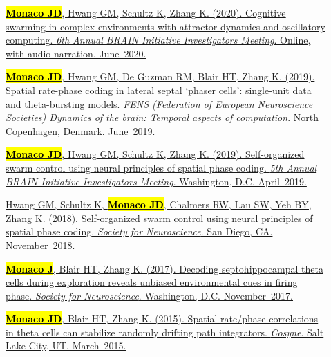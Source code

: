 \documentclass[10pt]{article}
\newcommand{\itemtitle}[1]{{\color{hopkinsblue}\ul{#1}}}
\newcommand{\joehl}[1]{\hl{\textbf{#1}}}
\begin{document}
\begin{description}
  \item[\quad]
    \href{https://www.cvent.com/events/6th-annual-brain-initiative-investigators-meeting/custom-116-4e2aadaa6cd549a3a4b53113cd172ad2.aspx}
    {\joehl{Monaco JD}, Hwang GM, Schultz K, Zhang K. (2020).
    \itemtitle{Cognitive swarming in complex environments with attractor
        dynamics and oscillatory computing}. \emph{6th Annual BRAIN Initiative
    Investigators Meeting}. Online, with audio narration. June~2020.}
  \item[\quad]
    \href{https://www.fens.org/Meetings/The-Brain-Conferences/Dynamics-of-the-brain/}
    {\joehl{Monaco JD}, Hwang GM, De Guzman RM, Blair HT, Zhang K. (2019).
    \itemtitle{Spatial rate-phase coding in lateral septal ‘phaser cells’:
        single-unit data and theta-bursting models}. \emph{FENS (Federation of
        European Neuroscience Societies) Dynamics of the brain: Temporal aspects of
    computation}. North Copenhagen, Denmark. June~2019.}
  \item[\quad]
    \href{https://www.cvent.com/events/5th-annual-brain-initiative-investigators-meeting/event-summary-de9c0d8f934b46eb8d80b55bcfbfe96a.aspx}
    {\joehl{Monaco JD}, Hwang GM, Schultz K, Zhang K. (2019).
    \itemtitle{Self-organized swarm control using neural principles of spatial
      phase coding}. \emph{5th Annual BRAIN Initiative Investigators Meeting}.
    Washington, D.C. April~2019.} 
  \item[\quad]
    \href{https://abstractsonline.com/pp8/#!/4649/presentation/10884}
    {Hwang GM, Schultz K, \joehl{Monaco JD}, Chalmers RW, Lau SW, Yeh BY,
      Zhang K. (2018). \itemtitle{Self-organized swarm control using neural
      principles of spatial phase coding}. \emph{Society for Neuroscience}.
    San Diego, CA. November~2018.}
  \item[\quad]
    \href{https://www.abstractsonline.com/pp8/#!/4376/presentation/6085}
    {\joehl{Monaco J}, Blair HT, Zhang K. (2017). \itemtitle{Decoding
        septohippocampal theta cells during exploration reveals unbiased
      environmental cues in firing phase}. \emph{Society for Neuroscience}.
    Washington, D.C. November~2017.}
  \item[\quad]
    \href{https://jdmonaco.com/files/monaco-paper-cosyne15.pdf}
    {\joehl{Monaco JD}, Blair HT, Zhang K. (2015). \itemtitle{Spatial
        rate/phase correlations in theta cells can stabilize randomly drifting path
    integrators}. \emph{Cosyne}. Salt Lake City, UT. March~2015.}

\end{description}
\end{document}
